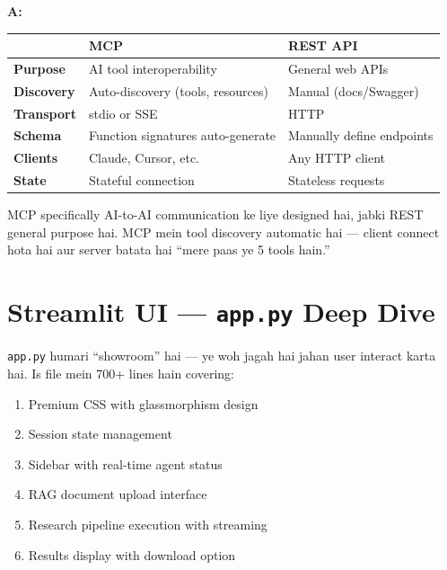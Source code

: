 \documentclass[12pt, a4paper]{article}
\begin{document}
\begin{interviewbox}[title={\faIcon{user-tie} ~Q: MCP vs REST API mein kya fark hai?}]
\textbf{A:}
\begin{center}
\small
\begin{tabular}{|l|p{5cm}|p{5cm}|}
\hline
\rowcolor{accentpurple!15}
& \textbf{MCP} & \textbf{REST API} \\
\hline
\textbf{Purpose} & AI tool interoperability & General web APIs \\
\hline
\textbf{Discovery} & Auto-discovery (tools, resources) & Manual (docs/Swagger) \\
\hline
\textbf{Transport} & stdio or SSE & HTTP \\
\hline
\textbf{Schema} & Function signatures auto-generate & Manually define endpoints \\
\hline
\textbf{Clients} & Claude, Cursor, etc. & Any HTTP client \\
\hline
\textbf{State} & Stateful connection & Stateless requests \\
\hline
\end{tabular}
\end{center}

MCP specifically AI-to-AI communication ke liye designed hai, jabki REST general purpose hai. MCP mein tool discovery automatic hai --- client connect hota hai aur server batata hai ``mere paas ye 5 tools hain.''
\end{interviewbox}


\newpage
\section{Streamlit UI --- \texttt{app.py} Deep Dive}

\begin{storybox}
\texttt{app.py} humari ``showroom'' hai --- ye woh jagah hai jahan user interact karta hai. Is file mein 700+ lines hain covering:
\begin{enumerate}
\item Premium CSS with glassmorphism design
\item Session state management
\item Sidebar with real-time agent status
\item RAG document upload interface
\item Research pipeline execution with streaming
\item Results display with download option
\end{enumerate}
\end{storybox}
\end{document}
